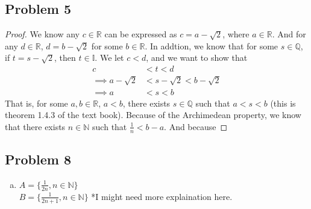 \documentclass[12pt]{article}
\begin{document}
\subsection*{Problem 5}
\begin{proof}
    We know any $c \in \mathbb{R}$ can be expressed as $c = a - \sqrt{2}$, where $a \in \mathbb{R}$. 
    And for any $d \in \mathbb{R}$, $d = b - \sqrt{2}$ for some $b \in \mathbb{R}$. 
    In addtion, we know that for some $s \in \mathbb{Q}$, if $t = s - \sqrt{2}$, then $t \in \mathbb{I}$. 
    We let $ c < d$, and we want to show that
    \begin{align*}
        c &< t < d\\
        \implies a - \sqrt{2} &< s - \sqrt{2} < b - \sqrt{2}\\
        \implies a &< s < b 
    \end{align*}
    That is, for some $a,b \in \mathbb{R}$, $a < b$, there exists $s \in \mathbb{Q}$ such that $a < s < b$ (this is theorem 1.4.3 of the text book). 
    Because of the Archimedean property, we know that there exists $n \in \mathbb{N}$ such that $\frac{1}{n} < b - a$. 
    And because 

    

    
    
\end{proof}

\subsection*{Problem 8}
\begin{enumerate}[a).]
    \item {
    $A = \{ \frac{1}{2n}, n \in \mathbb{N}\}$\\
    $B = \{ \frac{1}{2n+1}, n \in \mathbb{N}\}$
    *I might need more explaination here.
    }
\end{enumerate}
\end{document}
